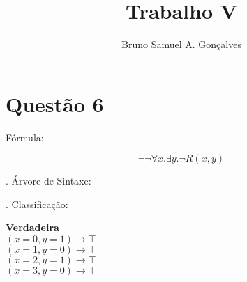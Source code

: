 \documentclass[12pt]{article}
\title{Trabalho V}
\author{Bruno Samuel A. Gonçalves}
\date{}
\begin{document}
\maketitle
\thispagestyle{empty}

\section{Questão 6}

\noindent Fórmula:

\[
    \neg\neg\forall x. \exists y. \neg R(x,y)
\]

. Árvore de Sintaxe:

\begin{center}
\end{center}

. Classificação:

\begin{center}
    \textbf{Verdadeira} \\
    $(x = 0, y = 1) \to \bm{\top}$ \\
    $(x = 1, y = 0) \to \bm{\top}$ \\
    $(x = 2, y = 1) \to \bm{\top}$ \\
    $(x = 3, y = 0) \to \bm{\top}$
\end{center}
\end{document}
